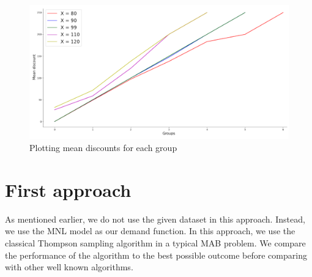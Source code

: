 \documentclass[a4paper]{article}
\begin{document}
\begin{figure}
	\centering
	\includegraphics[width=1\textwidth]{cut.png}
	\caption{\label{fig:cut}Plotting mean discounts for each group}
\end{figure}

\section{First approach}
As mentioned earlier, we do not use the given dataset in this approach. Instead, we use the MNL model as our demand function.
\newline
\newline
In this approach, we use the classical Thompson sampling algorithm in a typical MAB problem. We compare the performance of the algorithm to the best possible outcome before comparing with other well known algorithms.
\end{document}
